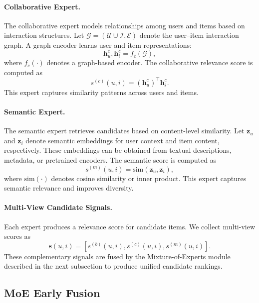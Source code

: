 \documentclass[sigconf,anonymous]{acmart}
\begin{document}
\paragraph{Collaborative Expert.}
The collaborative expert models relationships among users and items based on interaction structures. Let $\mathcal{G}=(\mathcal{U}\cup\mathcal{I}, \mathcal{E})$ denote the user--item interaction graph. A graph encoder learns user and item representations:
\begin{equation}
\mathbf{h}_u^{c}, \mathbf{h}_i^{c} = f_c(\mathcal{G}),
\end{equation}
where $f_c(\cdot)$ denotes a graph-based encoder. The collaborative relevance score is computed as
\begin{equation}
s^{(c)}(u,i) = (\mathbf{h}_u^{c})^\top \mathbf{h}_i^{c}.
\end{equation}
This expert captures similarity patterns across users and items.

\paragraph{Semantic Expert.}
The semantic expert retrieves candidates based on content-level similarity. Let $\mathbf{z}_u$ and $\mathbf{z}_i$ denote semantic embeddings for user context and item content, respectively. These embeddings can be obtained from textual descriptions, metadata, or pretrained encoders. The semantic score is computed as
\begin{equation}
s^{(m)}(u,i) = \text{sim}(\mathbf{z}_u, \mathbf{z}_i),
\end{equation}
where $\text{sim}(\cdot)$ denotes cosine similarity or inner product. This expert captures semantic relevance and improves diversity.

\paragraph{Multi-View Candidate Signals.}
Each expert produces a relevance score for candidate items. We collect multi-view scores as
\begin{equation}
\mathbf{s}(u,i) = 
\left[
s^{(b)}(u,i),
s^{(c)}(u,i),
s^{(m)}(u,i)
\right].
\end{equation}
These complementary signals are fused by the Mixture-of-Experts module described in the next subsection to produce unified candidate rankings.

\subsection{MoE Early Fusion}
\end{document}
